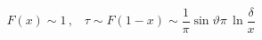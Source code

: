 \begin{equation}
F(x)\sim 1\, ,\, \, \, \, \, \tau \sim F(1-x)\sim \frac{1}{\pi }\sin
\vartheta \pi \, \ln \frac{\delta }{x}
\end{equation}

